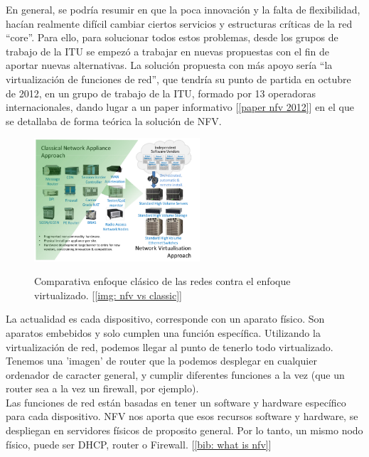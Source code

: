 \documentclass[12pt]{article}
\begin{document}
	\noindent En general, se podría resumir en que la poca innovación y la falta de flexibilidad, hacían realmente difícil cambiar ciertos servicios y estructuras críticas de la red ``core''. Para ello, para solucionar todos estos problemas, desde los grupos de trabajo de la ITU se empezó a trabajar en nuevas propuestas con el fin de aportar nuevas alternativas. La solución propuesta con más apoyo sería ``la virtualización de funciones de red'', que tendría su punto de partida en octubre de 2012, en un grupo de trabajo de la ITU, formado por 13 operadoras internacionales, dando lugar a un paper informativo [\ref{paper nfv 2012}] en el que se detallaba de forma teórica la solución de NFV.
	
	\begin{figure}[h]
		\begin{center}
			\includegraphics[width=0.55\textwidth]{img/classic_network_vs_nfv.png}
			\label{imagen comparativa classic network nfv}
			\caption{Comparativa enfoque clásico de las redes contra el enfoque virtualizado. [\ref{img: nfv vs classic}]}
		\end{center}
	\end{figure}

	\pagebreak
	
	\noindent La actualidad es cada dispositivo, corresponde con un aparato físico. Son aparatos embebidos y solo cumplen una función específica. Utilizando la virtualización de red, podemos llegar al punto de tenerlo todo virtualizado. Tenemos una 'imagen' de router que la podemos desplegar en cualquier ordenador de caracter general, y cumplir diferentes funciones a la vez (que un router sea a la vez un firewall, por ejemplo).\\
	
	\noindent Las funciones de red están basadas en tener un software y hardware específico para cada dispositivo. NFV nos aporta que esos recursos software y hardware, se despliegan en servidores físicos de proposito general. Por lo tanto, un mismo nodo físico, puede ser DHCP, router o Firewall. [\ref{bib: what is nfv}]\\
	
\end{document}
